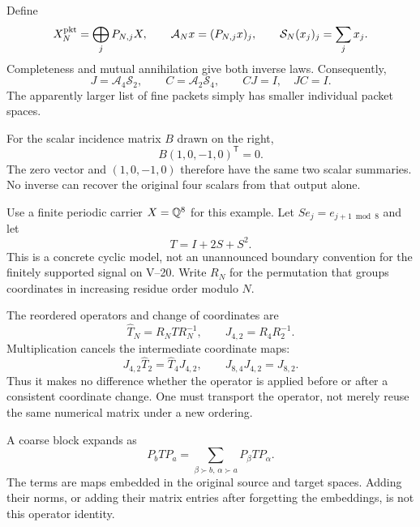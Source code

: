 Define
\[
X_N^{\rm pkt}=\bigoplus_j P_{N,j}X,
\qquad
\mathcal A_Nx=(P_{N,j}x)_j,
\qquad
\mathcal S_N(x_j)_j=\sum_jx_j.
\]
Completeness and mutual annihilation give both inverse laws. Consequently,
\[
J=\mathcal A_4\mathcal S_2,\qquad C=\mathcal A_2\mathcal S_4,
\qquad CJ=I,\quad JC=I.
\]
The apparently larger list of fine packets simply has smaller individual packet spaces.

For the scalar incidence matrix $B$ drawn on the right,
\[
B(1,0,-1,0)^\mathsf T=0.
\]
The zero vector and $(1,0,-1,0)$ therefore have the same two scalar summaries. No inverse can recover the original four scalars from that output alone.


Use a finite periodic carrier $X=\mathbb Q^8$ for this example. Let $Se_j=e_{j+1\bmod8}$ and let
\[
T=I+2S+S^2.
\]
This is a concrete cyclic model, not an unannounced boundary convention for the finitely supported signal on V--20. Write $R_N$ for the permutation that groups coordinates in increasing residue order modulo $N$.


The reordered operators and change of coordinates are
\[
\widehat T_N=R_NTR_N^{-1},\qquad J_{4,2}=R_4R_2^{-1}.
\]
Multiplication cancels the intermediate coordinate maps:
\[
J_{4,2}\widehat T_2=\widehat T_4J_{4,2},\qquad
J_{8,4}J_{4,2}=J_{8,2}.
\]
Thus it makes no difference whether the operator is applied before or after a consistent coordinate change. One must transport the operator, not merely reuse the same numerical matrix under a new ordering.

A coarse block expands as
\[
P_bTP_a=\sum_{\beta\succ b,\,\alpha\succ a}P_\beta TP_\alpha.
\]
The terms are maps embedded in the original source and target spaces. Adding their norms, or adding their matrix entries after forgetting the embeddings, is not this operator identity.


